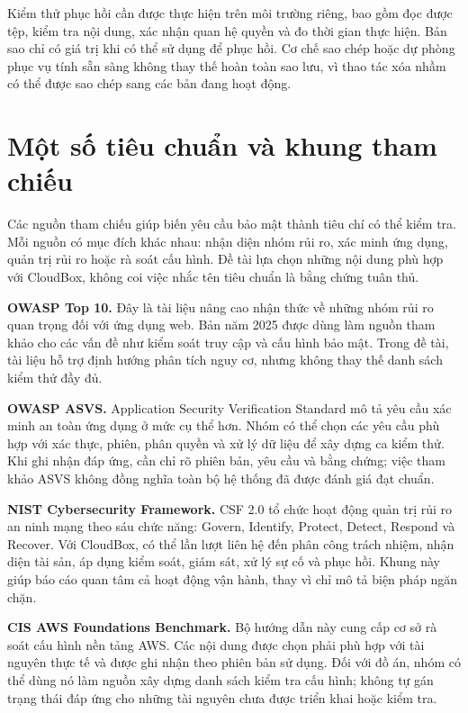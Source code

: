 Kiểm thử phục hồi cần được thực hiện trên môi trường riêng, bao gồm đọc được tệp, kiểm tra nội dung, xác nhận quan hệ quyền và đo thời gian thực hiện. Bản sao chỉ có giá trị khi có thể sử dụng để phục hồi. Cơ chế sao chép hoặc dự phòng phục vụ tính sẵn sàng không thay thế hoàn toàn sao lưu, vì thao tác xóa nhầm có thể được sao chép sang các bản đang hoạt động.

\section{Một số tiêu chuẩn và khung tham chiếu}
Các nguồn tham chiếu giúp biến yêu cầu bảo mật thành tiêu chí có thể kiểm tra. Mỗi nguồn có mục đích khác nhau: nhận diện nhóm rủi ro, xác minh ứng dụng, quản trị rủi ro hoặc rà soát cấu hình. Đề tài lựa chọn những nội dung phù hợp với CloudBox, không coi việc nhắc tên tiêu chuẩn là bằng chứng tuân thủ.

\textbf{OWASP Top 10.} Đây là tài liệu nâng cao nhận thức về những nhóm rủi ro quan trọng đối với ứng dụng web. Bản năm 2025 được dùng làm nguồn tham khảo cho các vấn đề như kiểm soát truy cập và cấu hình bảo mật. Trong đề tài, tài liệu hỗ trợ định hướng phân tích nguy cơ, nhưng không thay thế danh sách kiểm thử đầy đủ.\cite{top10}

\textbf{OWASP ASVS.} Application Security Verification Standard mô tả yêu cầu xác minh an toàn ứng dụng ở mức cụ thể hơn. Nhóm có thể chọn các yêu cầu phù hợp với xác thực, phiên, phân quyền và xử lý dữ liệu để xây dựng ca kiểm thử. Khi ghi nhận đáp ứng, cần chỉ rõ phiên bản, yêu cầu và bằng chứng; việc tham khảo ASVS không đồng nghĩa toàn bộ hệ thống đã được đánh giá đạt chuẩn.\cite{asvs}

\textbf{NIST Cybersecurity Framework.} CSF 2.0 tổ chức hoạt động quản trị rủi ro an ninh mạng theo sáu chức năng: Govern, Identify, Protect, Detect, Respond và Recover. Với CloudBox, có thể lần lượt liên hệ đến phân công trách nhiệm, nhận diện tài sản, áp dụng kiểm soát, giám sát, xử lý sự cố và phục hồi. Khung này giúp báo cáo quan tâm cả hoạt động vận hành, thay vì chỉ mô tả biện pháp ngăn chặn.\cite{csf}

\textbf{CIS AWS Foundations Benchmark.} Bộ hướng dẫn này cung cấp cơ sở rà soát cấu hình nền tảng AWS. Các nội dung được chọn phải phù hợp với tài nguyên thực tế và được ghi nhận theo phiên bản sử dụng. Đối với đồ án, nhóm có thể dùng nó làm nguồn xây dựng danh sách kiểm tra cấu hình; không tự gán trạng thái đáp ứng cho những tài nguyên chưa được triển khai hoặc kiểm tra.\cite{cis}

